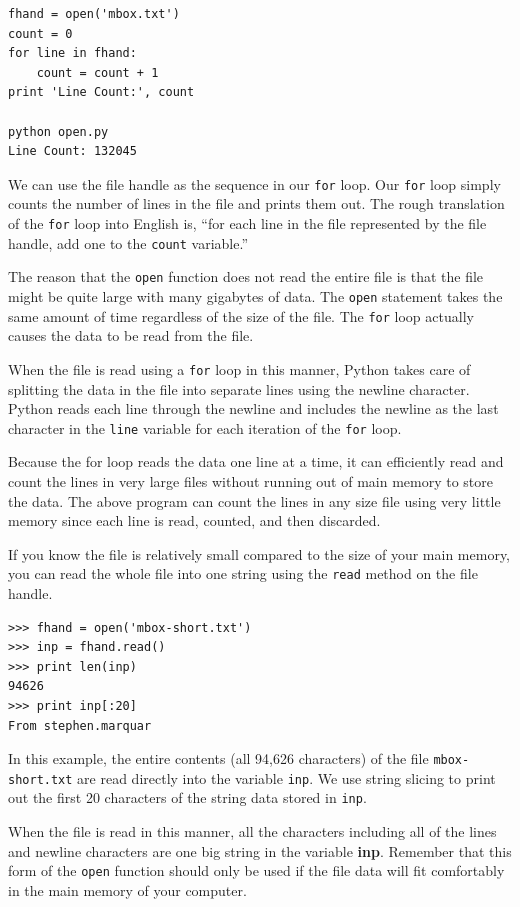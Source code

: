 \documentclass[10pt]{book}
\begin{document}
\beforeverb
\begin{verbatim}
fhand = open('mbox.txt')
count = 0
for line in fhand:
    count = count + 1
print 'Line Count:', count

python open.py 
Line Count: 132045
\end{verbatim}
\afterverb
%
We can use the file handle as the sequence in our {\tt for} loop.  
Our {\tt for} loop simply counts the number of lines in the 
file and prints them out.  The rough translation of the {\tt for}
loop into English is, ``for each line in the file represented by the file
handle, add one to the {\tt count} variable.''

The reason that the {\tt open} function does not read the entire file
is that the file might be quite large with many gigabytes of data.
The {\tt open} statement takes the same amount of time regardless of the
size of the file.  The {\tt for} loop actually causes the data to be 
read from the file.

When the file is read using a {\tt for} loop in this manner, Python
takes care of splitting the data in the file into separate lines using
the newline character.  Python reads each line through 
the newline and includes
the newline as the last character in the {\tt line} variable for each 
iteration of the {\tt for} loop.

Because the for loop reads the data one line at a time, it can efficiently
read and count the lines in very large files without running 
out of main memory to store the data.  The above program can 
count the lines in any size file using very little memory since 
each line is read, counted, and then discarded.

If you know the file is relatively small compared to the size of 
your main memory, you can read the whole file into one string
using the {\tt read} method on the file handle.

\beforeverb
\begin{verbatim}
>>> fhand = open('mbox-short.txt')
>>> inp = fhand.read()
>>> print len(inp)
94626
>>> print inp[:20]
From stephen.marquar
\end{verbatim}
\afterverb
%
In this example, the entire contents (all 94,626 characters) 
of the file {\tt mbox-short.txt} are read directly into the 
variable {\tt inp}.  We use string slicing to print out the first
20 characters of the string data stored in {\tt inp}.

When the file is read in this manner, all the characters including 
all of the lines and newline characters are one big string 
in the variable {\bf inp}.  
Remember that this form of the {\tt open} function should only be used
if the file data will fit comfortably in the main memory 
of your computer.
\end{document}
